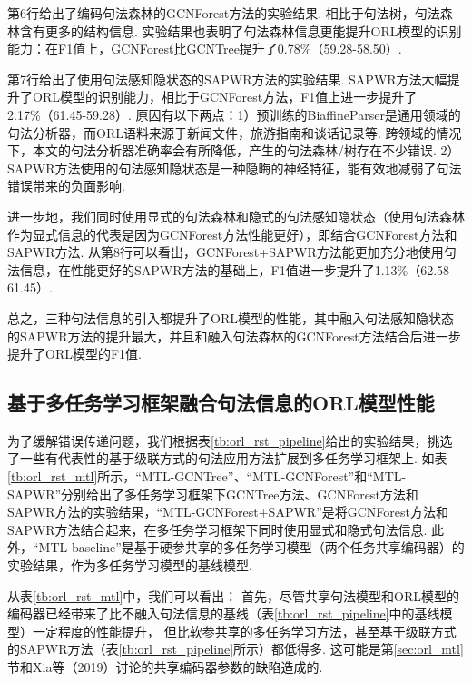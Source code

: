 第6行给出了编码句法森林的GCNForest方法的实验结果. 相比于句法树，句法森林含有更多的结构信息.
实验结果也表明了句法森林信息更能提升ORL模型的识别能力：在F1值上，GCNForest比GCNTree提升了0.78\%（59.28-58.50）.

第7行给出了使用句法感知隐状态的SAPWR方法的实验结果.
SAPWR方法大幅提升了ORL模型的识别能力，相比于GCNForest方法，F1值上进一步提升了2.17\%（61.45-59.28）.
原因有以下两点：1）预训练的BiaffineParser是通用领域的句法分析器，而ORL语料来源于新闻文件，旅游指南和谈话记录等. 跨领域的情况下，本文的句法分析器准确率会有所降低，产生的句法森林/树存在不少错误.
2）SAPWR方法使用的句法感知隐状态是一种隐晦的神经特征，能有效地减弱了句法错误带来的负面影响.

进一步地，我们同时使用显式的句法森林和隐式的句法感知隐状态（使用句法森林作为显式信息的代表是因为GCNForest方法性能更好），即结合GCNForest方法和SAPWR方法. 从第8行可以看出，GCNForest+SAPWR方法能更加充分地使用句法信息，在性能更好的SAPWR方法的基础上，F1值进一步提升了1.13\%（62.58-61.45）.

总之，三种句法信息的引入都提升了ORL模型的性能，其中融入句法感知隐状态的SAPWR方法的提升最大，并且和融入句法森林的GCNForest方法结合后进一步提升了ORL模型的F1值.

\subsection{基于多任务学习框架融合句法信息的ORL模型性能}

为了缓解错误传递问题，我们根据表\ref{tb:orl_rst_pipeline}给出的实验结果，挑选了一些有代表性的基于级联方式的句法应用方法扩展到多任务学习框架上.
如表\ref{tb:orl_rst_mtl}所示，“MTL-GCNTree”、“MTL-GCNForest”和“MTL-SAPWR”分别给出了多任务学习框架下GCNTree方法、GCNForest方法和SAPWR方法的实验结果，“MTL-GCNForest+SAPWR”是将GCNForest方法和SAPWR方法结合起来，在多任务学习框架下同时使用显式和隐式句法信息.
此外，“MTL-baseline”是基于硬参共享的多任务学习模型（两个任务共享编码器）的实验结果，作为多任务学习模型的基线模型.

从表\ref{tb:orl_rst_mtl}中，我们可以看出：
首先，尽管共享句法模型和ORL模型的编码器已经带来了比不融入句法信息的基线（表\ref{tb:orl_rst_pipeline}中的基线模型）一定程度的性能提升，
但比软参共享的多任务学习方法，甚至基于级联方式的SAPWR方法（表\ref{tb:orl_rst_pipeline}所示）都低得多.
这可能是第\ref{sec:orl_mtl}节和Xia等（2019）讨论的共享编码器参数的缺陷造成的.


